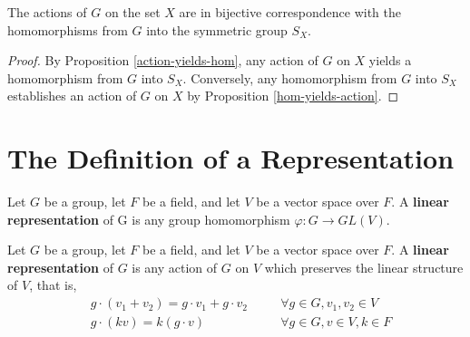 \begin{prop} \label{equivalence-of-actions}
The actions of $G$ on the set $X$ are in bijective correspondence with the homomorphisms from $G$ into the symmetric group $S_X$.
\end{prop}
\begin{proof}
By Proposition \ref{action-yields-hom}, any action of $G$ on $X$ yields a homomorphism from $G$ into $S_X$.    Conversely, any homomorphism from $G$ into $S_X$ establishes an action of $G$ on $X$ by Proposition \ref{hom-yields-action}.
\end{proof}


%
\section{The Definition of a Representation}

\begin{defn}
\label{rep-def-1}
Let $G$ be a group, let $F$ be a field, and let $V$ be a vector space over $F$.  A \textbf{linear representation} of G is any group homomorphism $\varphi\colon G \to GL(V)$. \end{defn}
 

\begin{defn}\label{rep-def-2}Let $G$ be a group, let $F$ be a field, and let $V$ be a vector space over $F$. A \textbf{linear representation} of $G$ is any action of $G$ on $V$ which preserves the linear structure of $V$, that is, 
\begin{align}
\label{rep-axiom-1}&g \cdot (v_1+v_2)=g \cdot v_1+g \cdot v_2 \quad && \forall g \in G, v_1, v_2 \in V \\
\label{rep-axiom-2}&g \cdot (kv) = k (g \cdot v) \quad && \forall g \in G, v \in V, k \in F
\end{align}
 \end{defn}
 
